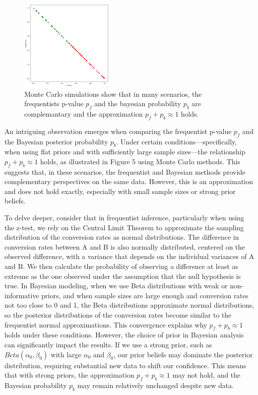 \documentclass[final,5p,times,twocolumn,authoryear]{elsarticle}
\begin{document}
\begin{figure}[h]
	\centering 
	\includegraphics[width=0.4\textwidth]{fig-5.png}	
	\caption{Monte Carlo simulations show that in many scenarios, the frequentists p-value $p_f$ and the bayesian probability $p_b$ are complemantary and the approximation  $ p_f + p_b \approx 1 $ holds.} 
\end{figure}

An intriguing observation emerges when comparing the frequentist p-value $ p_f $ and the Bayesian posterior probability $ p_b $. Under certain conditions—specifically, when using flat priors and with sufficiently large sample sizes—the relationship $ p_f + p_b \approx 1 $ holds, as illustrated in Figure 5 using Monte Carlo methods. This suggests that, in these scenarios, the frequentist and Bayesian methods provide complementary perspectives on the same data. However, this is an approximation and does not hold exactly, especially with small sample sizes or strong prior beliefs.

To delve deeper, consider that in frequentist inference, particularly when using the z-test, we rely on the Central Limit Theorem to approximate the sampling distribution of the conversion rates as normal distributions. The difference in conversion rates between A and B is also normally distributed, centered on the observed difference, with a variance that depends on the individual variances of A and B. We then calculate the probability of observing a difference at least as extreme as the one observed under the assumption that the null hypothesis is true. In Bayesian modeling, when we use Beta distributions with weak or non-informative priors, and when sample sizes are large enough and conversion rates not too close to 0 and 1, the Beta distributions approximate normal distributions, so the posterior distributions of the conversion rates become similar to the frequentist normal approximations. This convergence explains why $ p_f + p_b \approx 1 $ holds under these conditions. However, the choice of prior in Bayesian analysis can significantly impact the results. If we use a strong prior, such as $ Beta(\alpha_0, \beta_0) $ with large $ \alpha_0 $ and $ \beta_0 $, our prior beliefs may dominate the posterior distribution, requiring substantial new data to shift our confidence. This means that with strong priors, the approximation $ p_f + p_b \approx 1 $ may not hold, and the Bayesian probability $ p_b $ may remain relatively unchanged despite new data.
\end{document}
